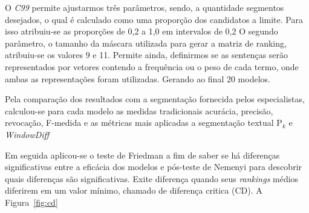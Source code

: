 O \textit{C99} permite ajustarmos três parâmetros, sendo, a quantidade segmentos desejados, o qual é calculado como uma proporção dos candidatos a limite. Para isso atribuiu-se as proporções de 0,2 a 1,0 em intervalos de 0,2 O segundo parâmetro, o tamanho da máscara utilizada para gerar a matriz de ranking, atribuiu-se os valores 9 e 11. Permite ainda, definirmos se as sentenças serão representados por vetores contendo a frequência ou o peso de cada termo, onde ambas as representações foram utilizadas. Gerando ao final 20 modelos.


Pela comparação dos resultados com a segmentação fornecida pelos especialistas, calculou-se para  cada modelo as medidas tradicionais acurácia, precisão, revocação, F-medida e as métricas mais aplicadas a segmentação textual P$_k$ e \textit{WindowDiff}




Em seguida aplicou-se o teste de Friedman a fim de saber se há diferenças significativas entre a eficácia dos modelos e pós-teste de Nemenyi para descobrir quais diferenças são significativas. 
%
Exite diferença quando seus \textit{rankings} médios diferirem em um valor mínimo, chamado de diferença critica (CD). A Figura~\ref{fig:cd} 


\newcommand{\cdsize}{0.6\textwidth}

